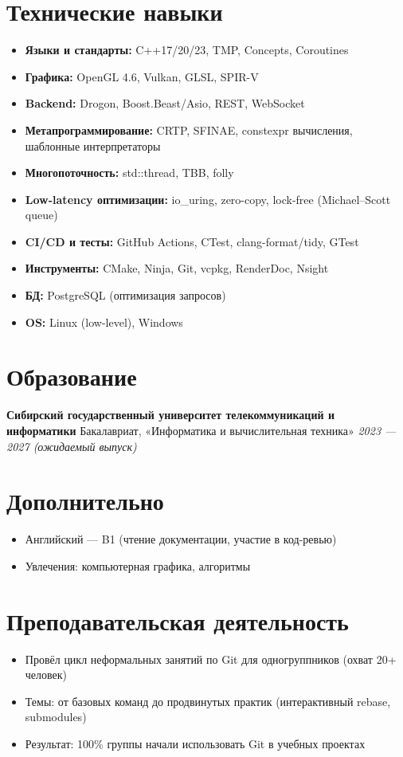 \documentclass[a4paper,10pt]{article}
\begin{document}
\section*{Технические навыки}
\begin{itemize}[noitemsep]
    \item \textbf{Языки и стандарты:} C++17/20/23, TMP, Concepts, Coroutines
    \item \textbf{Графика:} OpenGL 4.6, Vulkan, GLSL, SPIR-V
    \item \textbf{Backend:} Drogon, Boost.Beast/Asio, REST, WebSocket
    \item \textbf{Метапрограммирование:} CRTP, SFINAE, constexpr вычисления, шаблонные интерпретаторы
    
    \item \textbf{Многопоточность:} std::thread, TBB, folly
    \item \textbf{Low-latency оптимизации:} io\_uring,  zero-copy, lock-free (Michael–Scott queue)
    \item \textbf{CI/CD и тесты:} GitHub Actions, CTest, clang-format/tidy, GTest
    \item \textbf{Инструменты:} CMake, Ninja, Git, vcpkg, RenderDoc, Nsight
    \item \textbf{БД:} PostgreSQL (оптимизация запросов)
    \item \textbf{OS:} Linux (low-level), Windows
\end{itemize}

\section*{Образование}
\textbf{Сибирский государственный университет телекоммуникаций и информатики}  
Бакалавриат, «Информатика и вычислительная техника»  
\textit{2023 — 2027 (ожидаемый выпуск)}

\section*{Дополнительно}
\begin{itemize}[noitemsep]
    \item Английский — B1 (чтение документации, участие в код-ревью)
    \item Увлечения: компьютерная графика, алгоритмы
\end{itemize}

\section*{Преподавательская деятельность}
\begin{itemize}[noitemsep]
    \item Провёл цикл неформальных занятий по Git для одногруппников (охват 20+ человек)
    \item Темы: от базовых команд до продвинутых практик (интерактивный rebase, submodules)
    \item Результат: 100\% группы начали использовать Git в учебных проектах
\end{itemize}
\end{document}
